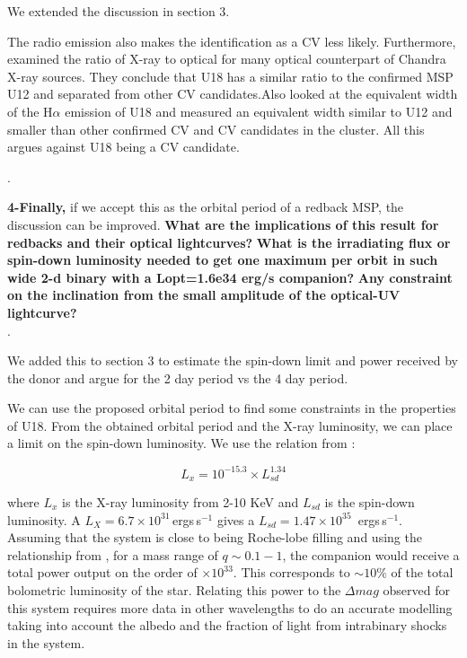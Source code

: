 \documentclass{article}
\newcommand{\ergs}{\,ergs\,s$^{-1}$} %
\begin{document}
 
 We extended the discussion in section 3. 
 
 
 \begin{displayquote}

 The radio emission also makes the identification as a CV less likely. Furthermore, \cite{cohn_identification_2010} examined the ratio of X-ray to optical for many optical counterpart of Chandra X-ray sources. They conclude that U18 has a similar ratio to the confirmed MSP U12 and separated from other CV candidates.Also  \cite{Pallanca2017Halpha} looked at the equivalent width of the H$\alpha$ emission of U18 and measured an equivalent width similar to U12 and smaller than other confirmed CV and CV candidates in the cluster. All this argues against U18 being a CV candidate.
 
\end{displayquote}
 \hrulefill. 

 


\textbf{4-Finally,} if we accept this as the orbital period of a redback MSP,
 the discussion can be improved. \textbf{What are the implications of this
 result for redbacks and their optical lightcurves?}  \textbf{What is the
 irradiating flux or spin-down luminosity needed to get one maximum
 per orbit in such wide 2-d binary with a Lopt=1.6e34 erg/s companion?}
 \textbf{Any constraint on the inclination from the small amplitude of the
 optical-UV lightcurve?}\\
 
 
  \hrulefill. 

 
 We added this to section 3 to estimate the spin-down limit and power received by the donor and argue for the 2 day period vs the 4 day period. 
 
\begin{displayquote}
We can use the proposed orbital period to find some constraints in the properties of U18. From the obtained orbital period and the X-ray luminosity, we can place a limit on the spin-down luminosity. We use the relation from \cite{Possenti2002}:

 $$L_x = 10^{-15.3} \times L_{sd}^{1.34} $$
 
 where $L_x$ is the X-ray luminosity from 2-10 KeV and $L_{sd}$ is the spin-down luminosity. A $L_X= 6.7 \times 10 ^{31}$\ergs \citep[0.3-8 keV;][]{bogdanov_chandra_2010} gives a $L_{sd} = 1.47\times 10 ^{35}$ \ergs. Assuming that the system is close to being Roche-lobe filling and using the relationship from \cite{EggletonRoche1983}, for a mass range of $q\sim0.1-1$, the companion would receive a total power output on the order of $\times 10^{33}$. This corresponds to $\sim 10 \%$ of the total bolometric luminosity of the star. Relating this power to the $\Delta mag$ observed for this system requires more data in other wavelengths to do an accurate modelling taking into account the albedo and the fraction of light from intrabinary shocks in the system.
\end{displayquote}
 
\end{document}
